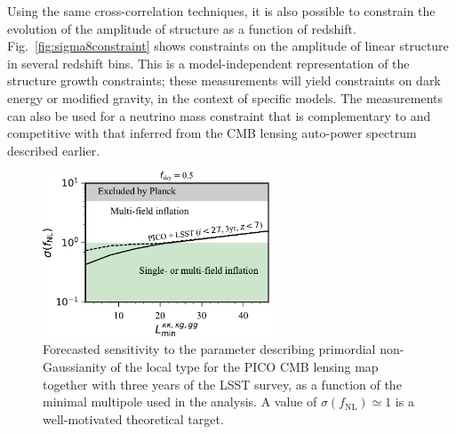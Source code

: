 \documentclass[PICOReport.tex]{subfiles}
\begin{document}
Using the same cross-correlation techniques, it is also possible to constrain the evolution of the amplitude of structure as a function of redshift.  Fig.~\ref{fig:sigma8constraint} shows constraints on the amplitude of linear structure in several redshift bins.  This is a model-independent representation of the structure growth constraints; these measurements will yield constraints on dark energy or modified gravity, in the context of specific models.  The measurements can also be used for a neutrino mass constraint that is complementary to and competitive with that inferred from the CMB lensing auto-power spectrum described earlier.  


\begin{figure}
\hspace{-0.in}
\parbox{3.1in}{\centerline {
\includegraphics[width=2.7in]{images/PICO_fnl_lmin_PICOv4.1b_deproj0_SENS0.pdf} } }
\hspace{0.in}
\parbox{3.3in}{
\caption{\captiontext 
Forecasted sensitivity to  the parameter describing primordial non-Gaussianity of the local type for the PICO CMB lensing map together with three years of the LSST survey, as a function of the minimal multipole used in the analysis. A value of $\sigma (f_\mathrm{NL}) \simeq 1$ is a well-motivated theoretical target.  
\label{fig:fnlconstraint} 
} }
\vspace{-0.1in}
\end{figure}

\end{document}
